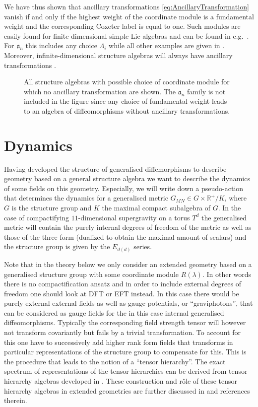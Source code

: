 We have thus shown that ancillary transformations \eqref{eq:AncillaryTransformation} vanish if and only if the highest weight of the coordinate module is a fundamental weight and the corresponding Coxeter label is equal to one. Such modules are easily found for finite dimensional simple Lie algebras and can be found in e.g.\ \cite{Fuchs1997}. For $\mathfrak{a}_n$ this includes any choice $\Lambda_i$ while all other examples are given in . Moreover, infinite-dimensional structure algebras will always have ancillary transformations \cite{CederwallPalmkvist2017}. 

\begin{figure}
    \centering
    \DynkinNoAncillary{}
    \caption{All structure algebras with possible choice of coordinate module for which no ancillary transformation are shown. The $\mathfrak{a}_n$ family is not included in the figure since any choice of fundamental weight leads to an algebra of diffeomorphisms without ancillary transformations.}
    \label{fig:DynkinNoAncillary}
\end{figure}


\section{Dynamics\label{sec:Dynamics}}
Having developed the structure of generalised diffemorphisms to describe geometry based on a general structure algebra we want to describe the dynamics of some fields on this geometry. Especially, we will write down a pseudo-action that determines the dynamics for a generalised metric $G_{MN}\in G\times \mathbb{R}^+/K$, where $G$ is the structure group and $K$ the maximal compact subalgebra of $G$. In the case of compactifying $11$-dimensional supergravity on a torus $T^d$ the generalised metric will contain the purely internal degrees of freedom of the metric as well as those of the three-form (dualized to obtain the maximal amount of scalars) and the structure group is given by the $E_{d(d)}$ series. 

Note that in the theory below we only consider an extended geometry based on a generalised structure group with some coordinate module $R(\lambda)$. In other words there is no compactification ansatz and in order to include external degrees of freedom one should look at DFT or EFT instead. In this case there would be purely external external fields as well as gauge potentials, or ``graviphotons'', that can be considered as gauge fields for the in this case internal generalised diffeomorphisms. Typically the corresponding field strength tensor will however not transform covariantly but fails by a trivial transformation. To account for this one have to successively add higher rank form fields that transforms in particular representations of the structure group to compensate for this. This is the procedure that  leads to the notion of a ``tensor hierarchy''. The exact spectrum of representations of the tensor hierarchies can be derived from tensor hierarchy algebras developed in \cite{Palmkvist:2013vya}. These construction and rôle of these tensor hierarchy algebras in extended geometries are further discussed in  \cite{Cederwall:2018aab,Carbone:2018njd} and references therein.

